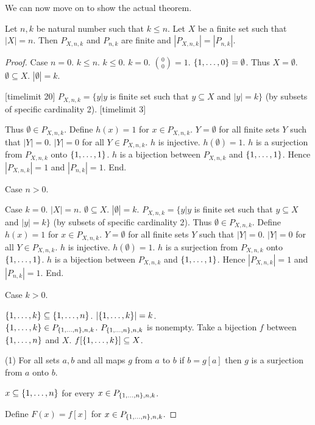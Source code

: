 \documentclass{article}
\begin{document}
%
We can now move on to show the actual theorem.
%
\begin{forthel}
\begin{lemma}
Let $n,k$ be natural number such that $k \leq n$.
Let $X$ be a finite set such that $|X|=n$.
Then $P_{X,n,k}$ and $P_{n,k}$ are finite and $|P_{X,n,k}|=|P_{n,k}|$.
\end{lemma}
\begin{proof}
	
Case $n=0$.
$k \leq n$.
$k \leq 0$.
$k = 0$.
$\binom{0}{0} = 1$.
$\{1,\dots,0\} = \emptyset$.
Thus $X = \emptyset$.
$\emptyset \subseteq X$. $|\emptyset|=k$.

[timelimit 20]
$P_{X,n,k} = \{y | y$ is finite set such that $y \subseteq X$ and $|y| = k\}$ (by subsets of specific cardinality 2).
[timelimit 3]

Thus $\emptyset \in P_{X,n,k}$.
Define $h(x) = 1$ for $x \in P_{X,n,k}$. 
$Y = \emptyset$ for all finite sets $Y$ such that $|Y|=0$.
$|Y|=0$ for all $Y \in P_{X,n,k}$.
$h$ is injective.
$h(\emptyset) = 1$.
$h$ is a surjection from $P_{X,n,k}$ onto $\{1,\dots,1\}$.
$h$ is a bijection between $P_{X,n,k}$ and $\{1,\dots,1\}$.
Hence $|P_{X,n,k}| = 1$ and $|P_{n,k}| = 1$. End.

Case $n>0$.

Case $k=0$.
$|X| = n$.
$\emptyset \subseteq X$. $|\emptyset|=k$.
$P_{X,n,k} = \{y | y$ is finite set such that $y \subseteq X$ and $|y| = k\}$ (by subsets of specific cardinality 2).
Thus $\emptyset \in P_{X,n,k}$.
Define $h(x) = 1$ for $x \in P_{X,n,k}$. 
$Y = \emptyset$ for all finite sets $Y$ such that $|Y|=0$.
$|Y|=0$ for all $Y \in P_{X,n,k}$.
$h$ is injective.
$h(\emptyset) = 1$.
$h$ is a surjection from $P_{X,n,k}$ onto $\{1,\dots,1\}$.
$h$ is a bijection between $P_{X,n,k}$ and $\{1,\dots,1\}$.
Hence $|P_{X,n,k}| = 1$ and $|P_{n,k}| = 1$. End.


Case $k>0$.

$\{1,\dots,k\} \subseteq \{1,\dots,n\}$.
$|\{1,\dots,k\}|=k$.\\
$\{1,\dots,k\} \in P_{\{1,\dots,n\},n,k}$.
$P_{\{1,\dots,n\},n,k}$ is nonempty.
Take a bijection $f$ between $\{1,\dots,n\}$ and $X$.
$f[\{1,\dots,k\}] \subseteq X$.

(1) For all sets $a,b$ and all maps $g$ from $a$ to $b$ if $b = g[a]$ then $g$ is a surjection from $a$ onto $b$.

$x \subseteq \{1,\dots,n\}$ for every $x \in P_{\{1,\dots,n\},n,k}$.

Define $F(x)=f[x]$ for $x \in P_{\{1,\dots,n\},n,k}$.


\end{proof}
\end{forthel}
\end{document}
